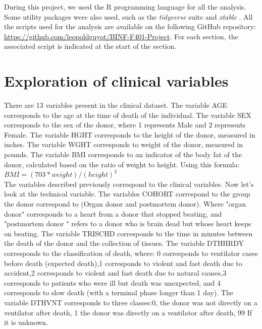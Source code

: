 \documentclass[a4paper, 11pt]{article}
\begin{document}
\begin{multicols}{2}
During this project, we used the R programming language \citep{R:2024} for all the analysis. Some utility packages were also used, such as the \textit{tidyverse} suite \citep{tidyverse} and \textit{xtable} \citep{xtable}.
All the scripts used for the analysis are available on the following GitHub repository: \url{https://github.com/leopoldguyot/BINF-F401-Project}.
For each section, the associated script is indicated at the start of the section.

\section{Exploration of  clinical variables}

There are 13 variables present in the clinical dataset.
The variable AGE corresponds to the age at the time of death of the individual.
The variable SEX corresponds to the sex of the donor, where 1 represents Male and 2 represents Female.
The variable HGHT corresponds to the height of the donor, measured in inches.
The variable WGHT corresponds to weight of the donor, measured in pounds. 
The variable BMI corresponds to an indicator of the body fat of the donor, calculated based on the ratio of weight to height. Using this formula: 
\\

$ BMI = (703*weight)/(height)^2$ 
\\

The variables described previously correspond to the clinical variables. Now let's look at the technical variable. 
The variables COHORT correspond to the group the donor correspond to (Organ donor and postmortem donor). Where "organ donor" corresponds to a heart from a donor that stopped beating, and "postmortem donor " refers to a donor who is brain dead but whose heart keeps on beating.
The variable TRISCHD corresponds to the time in minutes between the death of the donor and the collection of tissues.
The variable DTHHRDY corresponds to the classification of death, where: 0 corresponds to ventilator cases before death (expected death),1 corresponds to violent and fast death due to accident,2 corresponds to violent and fast death due to natural causes,3 corresponds to patients who were ill but death was unexpected, and 4 corresponds to slow death (with a terminal phase longer than 1 day). 
The variable DTHVNT corresponds to three classes:0, the donor was not directly on a ventilator after death, 1 the donor was directly on a ventilator after death, 99 If it is unknown.


\end{multicols}
\end{document}
